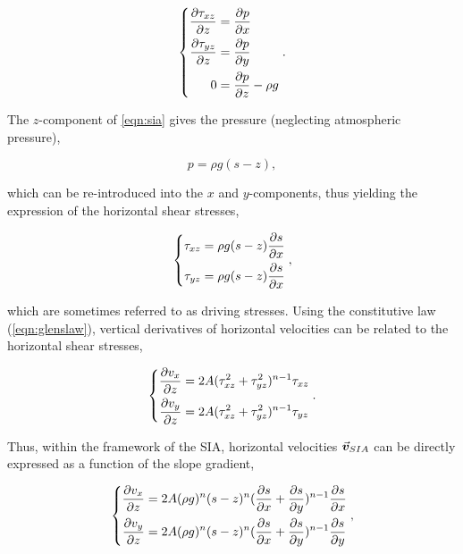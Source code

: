 \documentclass{article}
\newcommand{\vect}[1]{\va*{#1}} %
\newcommand{\vv}[0]{\vect{v}}           %
\begin{document}
\begin{equation}
    \label{eqn:sia}
    \left\{\begin{aligned}
        \pdv{\tau_{xz}}{z} &= \pdv{p}{x} \\
        \pdv{\tau_{yz}}{z} &= \pdv{p}{y} \\
        0 &= \pdv{p}{z} - \rho g
    \end{aligned}\right..
\end{equation}

The $z$-component of \cref{eqn:sia} gives the pressure (neglecting atmospheric
pressure),

\begin{equation}
    p = \rho g (s-z),
\end{equation}

which can be re-introduced into the $x$ and $y$-components, thus yielding the
expression of the horizontal shear stresses,

\begin{equation}
    \left\{\begin{aligned}
        \tau_{xz} &= \rho g (s-z) \pdv{s}{x} \\
        \tau_{yz} &= \rho g (s-z) \pdv{s}{x} \\
    \end{aligned}\right.,
\end{equation}

which are sometimes referred to as driving stresses. Using the constitutive
law (\ref{eqn:glenslaw}), vertical derivatives of horizontal velocities can
be related to the horizontal shear stresses,

\begin{equation}
    \left\{\begin{aligned}
        \pdv{v_x}{z} &= 2A (\tau_{xz}^2 + \tau_{yz}^2)^{n-1} \tau_{xz}\\
        \pdv{v_y}{z} &= 2A (\tau_{xz}^2 + \tau_{yz}^2)^{n-1} \tau_{yz}\\
    \end{aligned}\right..
\end{equation}

Thus, within the framework of the SIA, horizontal velocities $\vv_{SIA}$ can be
directly expressed as a function of the slope gradient,

\begin{equation}
    \left\{\begin{aligned}
        \pdv{v_x}{z} &= 2A (\rho g)^n (s-z)^n
                           (\pdv{s}{x}+\pdv{s}{y})^{n-1} \pdv{s}{x} \\
        \pdv{v_y}{z} &= 2A (\rho g)^n (s-z)^n
                           (\pdv{s}{x}+\pdv{s}{y})^{n-1} \pdv{s}{y} \\
    \end{aligned}\right.,
\end{equation}
\end{document}

